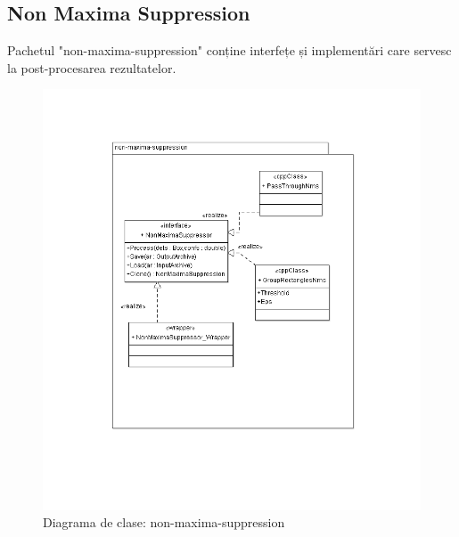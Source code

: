 \subsection{Non Maxima Suppression}
Pachetul "non-maxima-suppression" conține interfețe și implementări care servesc la post-procesarea rezultatelor.
\begin{figure}[h]
	\centering
		\includegraphics[width=1.00\textwidth]{uml/nonmaximasuppressionClassDiagram.png}
	\caption{Diagrama de clase: non-maxima-suppression}
	\label{fig:nonmaximasuppressionClassDiagram}
\end{figure}

